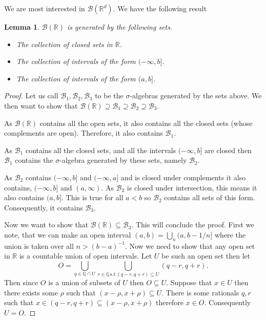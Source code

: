 \documentclass[11pt]{article}
\newtheorem{lem}[thm]{Lemma}
\theoremstyle{definition}
\theoremstyle{remark}
\begin{document}
We are most interested in $\mathcal{B}(\mathbb{R}^d)$. We have the following result
\begin{lem}
$\mathcal{B}(\mathbb{R})$ is generated by the following sets.
\begin{itemize}
\item The collection of closed sets in $\mathbb{R}$.
\item The collection of intervals of the form $(-\infty, b]$.
\item The collection of intervals of the form $(a,b]$.
\end{itemize}
\end{lem}
\begin{proof}
Let us call $\mathcal{B}_1, \mathcal{B}_2, \mathcal{B}_3$ to be the $\sigma$-algebras generated by the sets above. We then want to show that $\mathcal{B}(\mathbb{R}) \supseteq \mathcal{B}_1 \supseteq \mathcal{B}_2 \supseteq \mathcal{B}_3$. 

As $\mathcal{B}(\mathbb{R})$ contains all the open sets, it also contains all the closed sets (whose complements are open). Therefore, it also contains $\mathcal{B}_1$. 

As $\mathcal{B}_1$ contains all the closed sets, and all the intervals $(-\infty, b]$ are closed then $\mathcal{B}_1$ contains the $\sigma$-algebra generated by these sets, namely $\mathcal{B}_2$.

As $\mathcal{B}_2$ contains $(-\infty, b]$ and $(-\infty, a]$ and is closed under complements it also contains, $(-\infty, b]$ and $(a, \infty)$. As $\mathcal{B}_2$ is closed under intersection, this means it also contains $(a,b]$. This is true for all $a<b$ so $\mathcal{B}_2$ contains all sets of this form. Consequently, it contains $\mathcal{B}_3$.

Now we want to show that $\mathcal{B}(\mathbb{R}) \subseteq \mathcal{B}_3$. This will conclude the proof. First we note, that we can make an open interval $(a,b) = \bigcup_n (a, b-1/n]$ where the union is taken over all $n > (b-a)^{-1}$. Now we need to show that any open set in $\mathbb{R}$ is a countable union of open intervals. Let $U$ be such an open set then let 
\[ O = \bigcup_{q \in \mathbb{Q} \cap U} \bigcup_{r \in \mathbb{Q} \, \mbox{s.t} \, (q-r,q+r) \subseteq U} (q-r,q+r). \] Then since $O$ is a union of subsets of $U$ then $O \subseteq U$. Suppose that $x \in U$ then there exists some $\rho$ such that $(x-\rho, x+\rho) \subseteq U$. There is some rationals $q,r$ such that $x \in (q-r,q+r) \subseteq (x-\rho,x+\rho)$ therefore $x \in O$. Consequently $U= O$. 
\end{proof}
\end{document}
